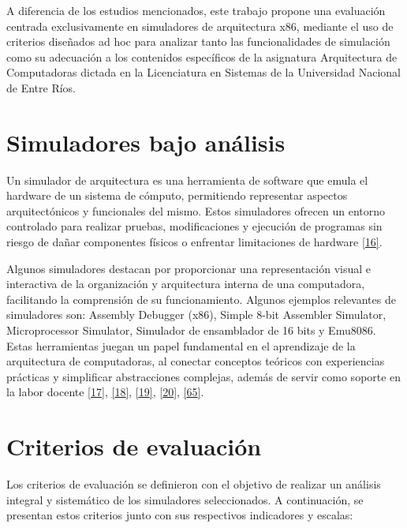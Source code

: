 \documentclass[12pt,oneside]{templates/unerthesis}
\begin{document}
A diferencia de los estudios mencionados, este trabajo propone una evaluación centrada exclusivamente en simuladores de arquitectura x86, mediante el uso de criterios diseñados ad hoc para analizar tanto las funcionalidades de simulación como su adecuación a los contenidos específicos de la asignatura Arquitectura de Computadoras dictada en la Licenciatura en Sistemas de la Universidad Nacional de Entre Ríos.

\hypertarget{simuladores-bajo-anuxe1lisis}{%
\section{Simuladores bajo análisis}\label{simuladores-bajo-anuxe1lisis}}

Un simulador de arquitectura es una herramienta de software que emula el hardware de un sistema de cómputo, permitiendo representar aspectos arquitectónicos y funcionales del mismo. Estos simuladores ofrecen un entorno controlado para realizar pruebas, modificaciones y ejecución de programas sin riesgo de dañar componentes físicos o enfrentar limitaciones de hardware \protect\hyperlink{ref-radivojevic_design_2011}{{[}16{]}}.

Algunos simuladores destacan por proporcionar una representación visual e interactiva de la organización y arquitectura interna de una computadora, facilitando la comprensión de su funcionamiento. Algunos ejemplos relevantes de simuladores son: Assembly Debugger (x86), Simple 8-bit Assembler Simulator, Microprocessor Simulator, Simulador de ensamblador de 16 bits y Emu8086. Estas herramientas juegan un papel fundamental en el aprendizaje de la arquitectura de computadoras, al conectar conceptos teóricos con experiencias prácticas y simplificar abstracciones complejas, además de servir como soporte en la labor docente \protect\hyperlink{ref-nikolic_survey_2009}{{[}17{]}}, \protect\hyperlink{ref-hasan_survey_2012}{{[}18{]}}, \protect\hyperlink{ref-hennessy2017computer}{{[}19{]}}, \protect\hyperlink{ref-stallings_computer_2021}{{[}20{]}}, \protect\hyperlink{ref-behrooz_computer_2005}{{[}65{]}}.

\hypertarget{criterios-de-evaluaciuxf3n}{%
\section{Criterios de evaluación}\label{criterios-de-evaluaciuxf3n}}

Los criterios de evaluación se definieron con el objetivo de realizar un análisis integral y sistemático de los simuladores seleccionados. A continuación, se presentan estos criterios junto con sus respectivos indicadores y escalas:
\end{document}
